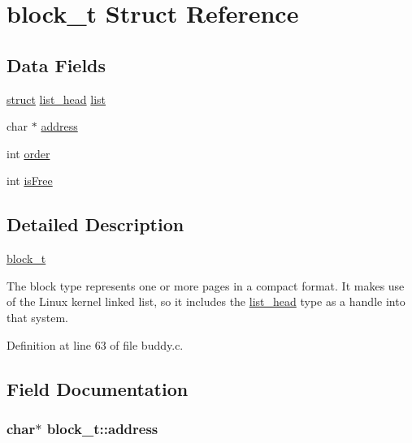 \hypertarget{structblock__t}{}\section{block\+\_\+t Struct Reference}
\label{structblock__t}
\subsection*{Data Fields}
\begin{DoxyCompactItemize}
\item 
\hyperlink{notes_8txt_aeb8c646dbe282a58600b038dd7f0fed2}{struct} \hyperlink{structlist__head}{list\+\_\+head} \hyperlink{structblock__t_a80d7be33d943c2f81034b125405a3dd4}{list}
\item 
char $\ast$ \hyperlink{structblock__t_aa2cbb00c1f450c796b741e1e5b0867bf}{address}
\item 
int \hyperlink{structblock__t_a82acc515c2099fec50f6f0b41bfb19ad}{order}
\item 
int \hyperlink{structblock__t_a623e67fc2865af94d9d86a7e99de20e4}{is\+Free}
\end{DoxyCompactItemize}


\subsection{Detailed Description}
\hyperlink{structblock__t}{block\+\_\+t}

The block type represents one or more pages in a compact format. It makes use of the Linux kernel linked list, so it includes the \hyperlink{structlist__head}{list\+\_\+head} type as a handle into that system. 

Definition at line 63 of file buddy.\+c.



\subsection{Field Documentation}
\subsubsection[{\texorpdfstring{address}{address}}]{\setlength{\rightskip}{0pt plus 5cm}char$\ast$ block\+\_\+t\+::address}\hypertarget{structblock__t_aa2cbb00c1f450c796b741e1e5b0867bf}{}\label{structblock__t_aa2cbb00c1f450c796b741e1e5b0867bf}


